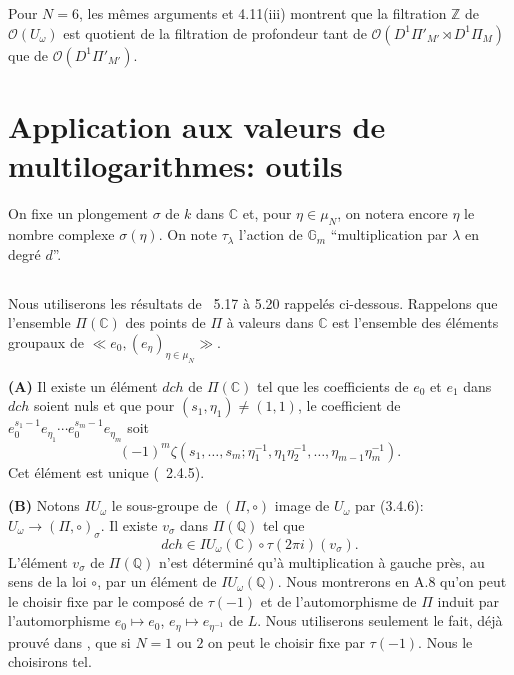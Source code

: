 \documentclass[11pt,a4paper]{article}
\theoremstyle{plain}
\theoremstyle{definition}
\newcommand{\dch}{\mathit{dch}}
\newcommand{\Gm}{\mathbb{G}_m}
\newcommand{\Q}{\mathbb{Q}}
\newcommand{\Z}{\mathbb{Z}}
\newcommand{\C}{\mathbb{C}}
\begin{document}
\subsection{}
Pour $N=6$, les m\^emes arguments et 4.11(iii) montrent que la filtration $\Z$ de $\mathcal{O}(U_\omega)$ est quotient de la filtration de profondeur tant de $\mathcal{O}(D^1\Pi'_{M'} \rtimes D^1\Pi_M)$ que de $\mathcal{O}(D^1\Pi'_{M'})$.

\section{Application aux valeurs de multilogarithmes: outils}
\label{sec:5}

On fixe un plongement $\sigma$ de $k$ dans $\C$ et, pour $\eta \in \mu_N$, on notera encore $\eta$ le nombre complexe $\sigma(\eta)$. On note $\tau_\lambda$ l'action de $\Gm$ ``multiplication par $\lambda$ en degr\'e $d$''.

\subsection{}
Nous utiliserons les r\'esultats de \cite{1}~5.17 \`a 5.20 rappel\'es ci-dessous. Rappelons que l'ensemble $\Pi(\C)$ des points de $\Pi$ \`a valeurs dans $\C$ est l'ensemble des \'el\'ements groupaux de $\ll e_0, (e_\eta)_{\eta \in \mu_N} \gg$.

\textbf{(A)} Il existe un \'el\'ement $\dch$ de $\Pi(\C)$ tel que les coefficients de $e_0$ et $e_1$ dans $\dch$ soient nuls et que pour $(s_1, \eta_1) \neq (1,1)$, le coefficient de $e_0^{s_1-1}e_{\eta_1} \cdots e_0^{s_m-1}e_{\eta_m}$ soit
\[
(-1)^m \zeta(s_1,\ldots,s_m; \eta_1^{-1}, \eta_1\eta_2^{-1},\ldots, \eta_{m-1}\eta_m^{-1}).
\]
Cet \'el\'ement est unique (\cite{1}~2.4.5).

\textbf{(B)} Notons $IU_\omega$ le sous-groupe de $(\Pi, \circ)$ image de $U_\omega$ par (3.4.6): $U_\omega \to (\Pi, \circ)_\sigma$. Il existe $v_\sigma$ dans $\Pi(\Q)$ tel que
\begin{equation}\label{eq:5.1.1}
\dch \in IU_\omega(\C) \circ \tau(2\pi i)(v_\sigma).
\end{equation}
L'\'el\'ement $v_\sigma$ de $\Pi(\Q)$ n'est d\'etermin\'e qu'\`a multiplication \`a gauche pr\`es, au sens de la loi $\circ$, par un \'el\'ement de $IU_\omega(\Q)$. Nous montrerons en A.8 qu'on peut le choisir fixe par le compos\'e de $\tau(-1)$ et de l'automorphisme de $\Pi$ induit par l'automorphisme $e_0 \mapsto e_0$, $e_\eta \mapsto e_{\eta^{-1}}$ de $L$. Nous utiliserons seulement le fait, d\'ej\`a prouv\'e dans \cite{1}, que si $N=1$ ou $2$ on peut le choisir fixe par $\tau(-1)$. Nous le choisirons tel.
\end{document}
